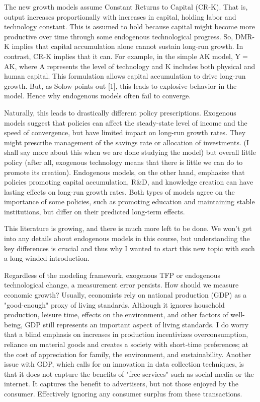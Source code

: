 \documentclass[10pt]{article}
\begin{document}
The new growth models assume Constant Returns to Capital (CR-K). That is, output increases proportionally with increases in capital, holding labor and technology constant. This is assumed to hold because capital might become more productive over time through some endogenous technological progress. So, DMR-K implies that capital accumulation alone cannot sustain long-run growth. In contrast, CR-K implies that it can. For example, in the simple AK model, $\mathrm{Y}=$ AK, where A represents the level of technology and K includes both physical and human capital. This formulation allows capital accumulation to drive long-run growth. But, as Solow points out [1], this leads to explosive behavior in the model. Hence why endogenous models often fail to converge.

Naturally, this leads to drastically different policy prescriptions. Exogenous models suggest that policies can affect the steady-state level of income and the speed of convergence, but have limited impact on long-run growth rates. They might prescribe management of the savings rate or allocation of investments. (I shall say more about this when we are done studying the model) but overall little policy (after all, exogenous technology means that there is little we can do to promote its creation). Endogenous models, on the other hand, emphasize that policies promoting capital accumulation, R\&D, and knowledge creation can have lasting effects on long-run growth rates. Both types of models agree on the importance of some policies, such as promoting education and maintaining stable institutions, but differ on their predicted long-term effects.

This literature is growing, and there is much more left to be done. We won't get into any details about endogenous models in this course, but understanding the key differences is crucial and thus why I wanted to start this new topic with such a long winded introduction.

Regardless of the modeling framework, exogenous TFP or endogenous technological change, a measurement error persists. How should we measure economic growth? Usually, economists rely on national production (GDP) as a "good-enough" proxy of living standards. Although it ignores household production, leisure time, effects on the environment, and other factors of well-being, GDP still represents an important aspect of living standards. I do worry that a blind emphasis on increases in production incentivizes overconsumption, reliance on material goods and creates a society with short-time preferences; at the cost of appreciation for family, the environment, and sustainability. Another issue with GDP, which calls for an innovation in data collection techniques, is that it does not capture the benefits of "free services" such as social media or the internet. It captures the benefit to advertisers, but not those enjoyed by the consumer. Effectively ignoring any consumer surplus from these transactions.
\end{document}
